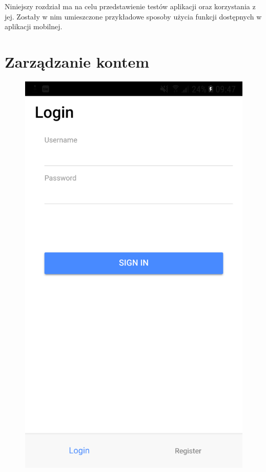 Niniejszy rozdział ma na celu przedstawienie testów aplikacji oraz korzystania z jej. Zostały w nim umieszczone przykładowe sposoby użycia funkcji dostępnych w aplikacji mobilnej.



\section{Zarządzanie kontem}
\begin{figure}[htb]
\noindent\begin{minipage}{0.4\textwidth}\raggedleft
	\includegraphics[width=\linewidth]{"images/login_page"}

\end{minipage}
\end{figure}
